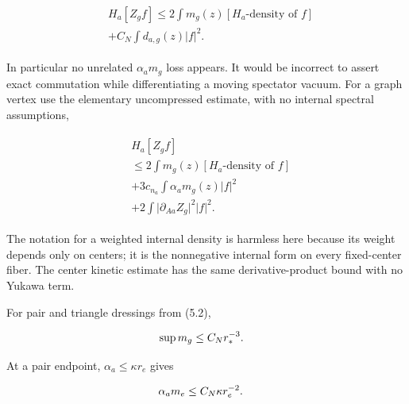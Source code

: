 \begin{gather*}
\begin{aligned}
& H_{a}[Z_{g} f] \le  2 \int  m_{g}(z) [H_{a}\text{-density of }f] \\
& + C_{N} \int  d_{a,g}(z)\vert f\vert ^{2}.
\end{aligned}\tag{6.1}
\end{gather*}

In particular no unrelated \(\alpha _{a} m_{g}\) loss appears. It would
be incorrect to assert exact commutation while differentiating a moving
spectator vacuum. For a graph vertex use the elementary uncompressed
estimate, with no internal spectral assumptions,

\begin{gather*}
\begin{aligned}
& H_{a}[Z_{g} f] \\
& \le  2 \int  m_{g}(z) [H_{a}\text{-density of }f] \\
& + 3c_{n_{a}} \int  \alpha _{a} m_{g}(z)\vert f\vert ^{2} \\
& + 2 \int  \vert \partial _{Aa} Z_{g}\vert ^{2} \vert f\vert ^{2}.
\end{aligned}\tag{6.2}
\end{gather*}

The notation for a weighted internal density is harmless here because
its weight depends only on centers; it is the nonnegative internal form
on every fixed-center fiber. The center kinetic estimate has the same
derivative-product bound with no Yukawa term.

For pair and triangle dressings from (5.2),

\begin{gather*}
\begin{aligned}
& \sup  m_{g} \le  C_{N} r_{*}^{-3}.
\end{aligned}\notag
\end{gather*}

At a pair endpoint, \(\alpha _{a}\le \kappa  r_{e}\) gives

\begin{gather*}
\begin{aligned}
& \alpha _{a} m_{e} \le  C_{N} \kappa  r_{e}^{-2}.
\end{aligned}\notag
\end{gather*}

